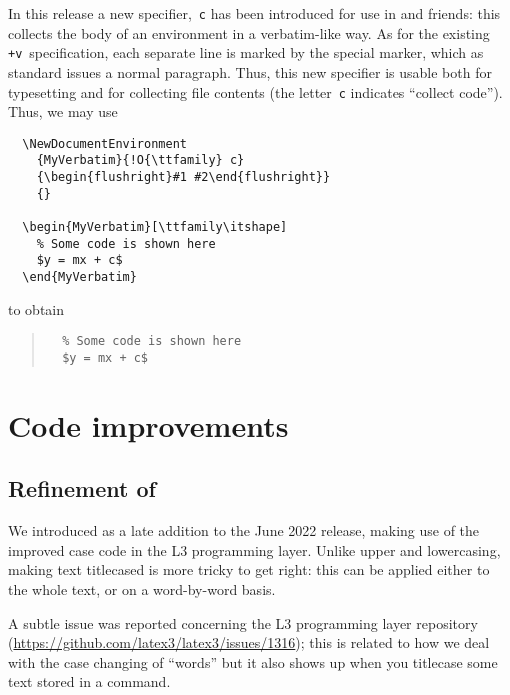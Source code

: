 \documentclass{ltnews}
\begin{document}
In this release a new specifier,~\texttt{c} has been introduced for
use in  and friends: this collects the body
of an environment in a verbatim-like way.  As for the existing
\texttt{+v}~specification, each separate line is marked by the special
 marker, which as standard issues a normal
paragraph. Thus, this new specifier is usable both for typesetting and
for collecting file contents (the letter~\texttt{c} indicates
\enquote{collect code}).  Thus, we may use
\begin{verbatim}
  \NewDocumentEnvironment
    {MyVerbatim}{!O{\ttfamily} c}
    {\begin{flushright}#1 #2\end{flushright}}
    {}
    
  \begin{MyVerbatim}[\ttfamily\itshape]
    % Some code is shown here
    $y = mx + c$
  \end{MyVerbatim}
\end{verbatim}
to obtain
\begin{quote}
\makeatletter
\def\@verbatim{%
  \trivlist
  \raggedleft
  \let \do \@makeother
  \dospecials
  \obeylines
  \normalfont \ttfamily \itshape
  \@noligs
}
\begin{verbatim}
  % Some code is shown here
  $y = mx + c$
\end{verbatim}
\end{quote}



\section{Code improvements}

\subsection{Refinement of }

We introduced  as a late addition to the June 2022
release, making use of the improved case code in the L3 programming
layer. Unlike upper and lowercasing, making text titlecased is more
tricky to get right: this can be applied either to the whole text, or
on a word-by-word basis.

A subtle issue was reported concerning the L3 programming layer
repository (\url{https://github.com/latex3/latex3/issues/1316}); this
is related to how we deal with the case changing of \enquote{words}
but it also shows up when you titlecase some text stored in a command.
\end{document}
